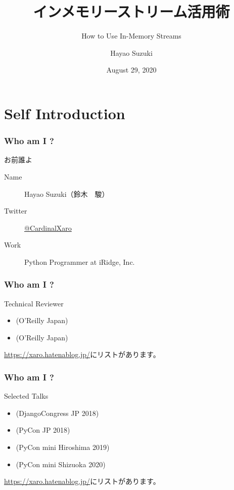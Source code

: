 \documentclass[aspectratio=169,dvipdfmx,14pt,notheorems]{beamer}
\title{インメモリーストリーム活用術}
\subtitle{How to Use In-Memory Streams}
\author[Hayao]{Hayao Suzuki}
\institute[PyCon JP 2020]{PyCon JP 2020 \#pyconjp\_1}
\date{August 29, 2020}
\theoremstyle{definition}
\begin{document}
\begin{frame}[plain]\frametitle{}
\titlepage %
\end{frame}

\section{Self Introduction}

\begin{frame}\frametitle{Who am I ?}

\begin{block}{お前誰よ}
\begin{description}
\item[Name] Hayao Suzuki（鈴木　駿）
\item[Twitter] \href{https://twitter.com/CardinalXaro}{@CardinalXaro}
\item[Work] Python Programmer at iRidge, Inc.
\end{description}
\end{block}

\end{frame}

\begin{frame}\frametitle{Who am I ?}

\begin{block}{Technical Reviewer}
\begin{itemize}
\item {}(O'Reilly Japan)
\item {}(O'Reilly Japan)
\end{itemize}
\end{block}
\url{https://xaro.hatenablog.jp/}にリストがあります。
\end{frame}

\begin{frame}\frametitle{Who am I ?}

\begin{block}{Selected Talks}
\begin{itemize}
\item {}(DjangoCongress JP 2018)
\item {}(PyCon JP 2018)
\item {}(PyCon mini Hiroshima 2019)
\item {}(PyCon mini Shizuoka 2020)
\end{itemize}
\end{block}
\url{https://xaro.hatenablog.jp/}にリストがあります。
\end{frame}
\end{document}
